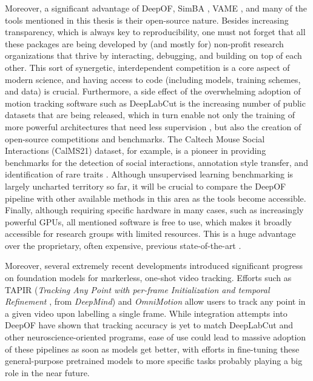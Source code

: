 Moreover, a significant advantage of DeepOF, SimBA \cite{Ro2020SimpleAnimals}, VAME \cite{Luxem2022IdentifyingMotion}, and many of the tools mentioned in this thesis is their open-source nature. Besides increasing transparency, which is always key to reproducibility, one must not forget that all these packages are being developed by (and mostly for) non-profit research organizations that thrive by interacting, debugging, and building on top of each other. This sort of synergetic, interdependent competition is a core aspect of modern science, and having access to code (including models, training schemes, and data) is crucial. Furthermore, a side effect of the overwhelming adoption of motion tracking software such as DeepLabCut is the increasing number of public datasets that are being released, which in turn enable not only the training of more powerful architectures that need less supervision \cite{Ye2022SuperAnimalBehavior}, but also the creation of open-source competitions and benchmarks. The Caltech Mouse Social Interactions (CalMS21) dataset, for example, is a pioneer in providing benchmarks for the detection of social interactions, annotation style transfer, and identification of rare traits \cite{Caltech2021TheInteractions}. Although unsupervised learning benchmarking is largely uncharted territory so far, it will be crucial to compare the DeepOF pipeline with other available methods in this area as the tools become accessible. Finally, although requiring specific hardware in many cases, such as increasingly powerful GPUs, all mentioned software is free to use, which makes it broadly accessible for research groups with limited resources. This is a huge advantage over the proprietary, often expensive, previous state-of-the-art \cite{ANY-maze}.

Moreover, several extremely recent developments introduced significant progress on foundation models for markerless, one-shot video tracking. Efforts such as TAPIR (\textit{Tracking Any Point with per-frame Initialization and temporal Refinement
}, from \textit{DeepMind}) \cite{DoerschTAPIR:Refinement} and \textit{OmniMotion} \cite{WangTrackingOnce} allow users to track any point in a given video upon labelling a single frame. While integration attempts into DeepOF have shown that tracking accuracy is yet to match DeepLabCut and other neuroscience-oriented programs, ease of use could lead to massive adoption of these pipelines as soon as models get better, with efforts in fine-tuning these general-purpose pretrained models to more specific tasks probably playing a big role in the near future.

